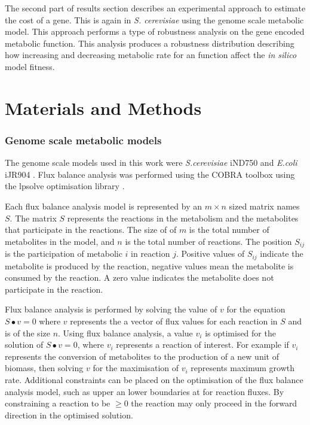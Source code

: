 The second part of results section describes an experimental approach to estimate the cost of a gene. This is again in \emph{S. cerevisiae} using the genome scale metabolic model. This approach performs a type of robustness analysis on the gene encoded metabolic function. This analysis produces a robustness distribution describing how increasing and decreasing metabolic rate for an function affect the \emph{in silico} model fitness.

\clearpage

\section{Materials and Methods}

\subsubsection{Genome scale metabolic models}

The genome scale models used in this work were \emph{S.cerevisiae} iND750 \cite{duarte2004a} and \emph{E.coli} iJR904 \cite{reed2003}. Flux balance analysis was performed using the COBRA toolbox \cite{becker2007} using the lpsolve optimisation library \cite{lpsolve}.

Each flux balance analysis model is represented by an $m \times n$ sized matrix names $S$. The matrix $S$ represents the reactions in the metabolism and the metabolites that participate in the reactions. The size of of $m$ is the total number of metabolites in the model, and $n$ is the total number of reactions. The position $S_{ij}$ is the participation of metabolic $i$ in reaction $j$. Positive values of $S_{ij}$ indicate the metabolite is produced by the reaction, negative values mean the metabolite is consumed by the reaction. A zero value indicates the metabolite does not participate in the reaction.

Flux balance analysis is performed by solving the value of $v$ for the equation $S \bullet v = 0$ where $v$ represents the a vector of flux values for each reaction in $S$ and is of the size $n$. Using flux balance analysis, a value $v_{i}$ is optimised for the solution of $S \bullet v = 0$, where $v_{i}$ represents a reaction of interest. For example if $v_{i}$ represents the conversion of metabolites to the production of a new unit of biomass, then solving $v$ for the maximisation of $v_{i}$ represents maximum growth rate. Additional constraints can be placed on the optimisation of the flux balance analysis model, such as upper an lower boundaries at for reaction fluxes. By constraining a reaction to be $\geq 0$ the reaction may only proceed in the forward direction in the optimised solution.

